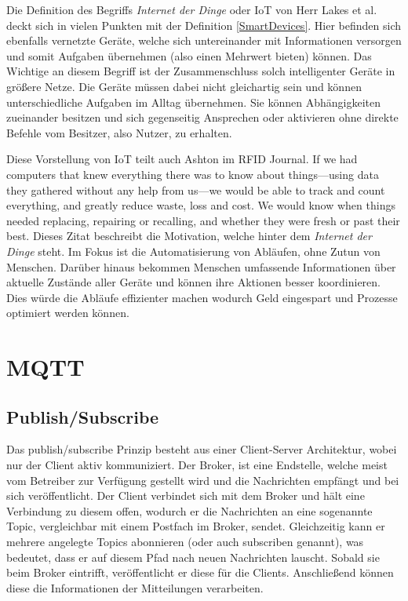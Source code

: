         Die Definition des Begriffs \emph{Internet der Dinge} oder \ac{IoT} von Herr Lakes et al. deckt sich in vielen Punkten mit der Definition \ref{SmartDevices}. Hier befinden sich ebenfalls vernetzte Geräte, welche sich untereinander mit Informationen versorgen und somit Aufgaben übernehmen (also einen Mehrwert bieten) können. Das Wichtige an diesem Begriff ist der Zusammenschluss solch intelligenter Geräte in größere Netze. Die Geräte müssen dabei nicht gleichartig sein und können unterschiedliche Aufgaben im Alltag übernehmen. Sie können Abhängigkeiten zueinander besitzen und sich gegenseitig Ansprechen oder aktivieren ohne direkte Befehle vom Besitzer, also Nutzer, zu erhalten.
        
        Diese Vorstellung von \ac{IoT} teilt auch Ashton im RFID Journal.
        \grqq If we had computers that knew everything there was to know about things—using data they gathered without any help from us—we would be able to track and count everything, and greatly reduce waste, loss and cost. We would know when things needed replacing, repairing or recalling, and whether they were fresh or past their best.\glqq{} \cite{ashton2009internet}
        Dieses Zitat beschreibt die Motivation, welche hinter dem \emph{Internet der Dinge} steht.
        Im Fokus ist die Automatisierung von Abläufen, ohne Zutun von Menschen. Darüber hinaus bekommen Menschen umfassende Informationen über aktuelle Zustände aller Geräte und können ihre Aktionen besser koordinieren. Dies würde die Abläufe effizienter machen wodurch Geld eingespart und Prozesse optimiert werden können.

\section{MQTT}
    \subsection{Publish/Subscribe}
    Das publish/subscribe Prinzip besteht aus einer Client-Server Architektur, wobei nur der Client aktiv kommuniziert. Der Broker, ist eine Endstelle, welche meist vom Betreiber zur Verfügung gestellt wird und die Nachrichten empfängt und bei sich veröffentlicht. Der Client verbindet sich mit dem Broker und hält eine Verbindung zu diesem offen, wodurch er die Nachrichten an eine sogenannte Topic, vergleichbar mit einem Postfach im Broker, sendet. Gleichzeitig kann er mehrere angelegte Topics abonnieren (oder auch subscriben genannt), was bedeutet, dass er auf diesem Pfad nach neuen Nachrichten lauscht. Sobald sie beim Broker eintrifft, veröffentlicht er diese für die Clients. Anschließend können diese die Informationen der Mitteilungen verarbeiten.

